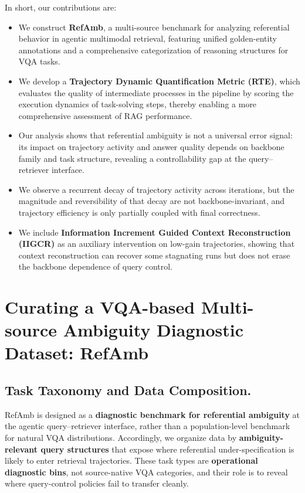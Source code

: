 \documentclass{article} %
\begin{document}
In short, our contributions are:
\begin{itemize}
    \item We construct \textbf{RefAmb}, a multi-source benchmark for analyzing referential behavior in agentic multimodal retrieval, featuring unified golden-entity annotations and a comprehensive categorization of reasoning structures for VQA tasks.
    \item We develop a \textbf{Trajectory Dynamic Quantification Metric (RTE)}, which evaluates the quality of intermediate processes in the pipeline by scoring the execution dynamics of task-solving steps, thereby enabling a more comprehensive assessment of RAG performance.
    \item Our analysis shows that referential ambiguity is not a universal error signal: its impact on trajectory activity and answer quality depends on backbone family and task structure, revealing a controllability gap at the query--retriever interface.
    \item We observe a recurrent decay of trajectory activity across iterations, but the magnitude and reversibility of that decay are not backbone-invariant, and trajectory efficiency is only partially coupled with final correctness.
    \item We include \textbf{Information Increment Guided Context Reconstruction (IIGCR)} as an auxiliary intervention on low-gain trajectories, showing that context reconstruction can recover some stagnating runs but does not erase the backbone dependence of query control.
\end{itemize}

\section{Curating a VQA-based Multi-source Ambiguity Diagnostic Dataset: RefAmb}
\subsection{Task Taxonomy and Data Composition.}

RefAmb is designed as a \textbf{diagnostic benchmark for referential ambiguity} at the agentic query--retriever interface, rather than a population-level benchmark for natural VQA distributions.
Accordingly, we organize data by \textbf{ambiguity-relevant query structures} that expose where referential under-specification is likely to enter retrieval trajectories.
These task types are \textbf{operational diagnostic bins}, not source-native VQA categories, and their role is to reveal where query-control policies fail to transfer cleanly.
\end{document}
